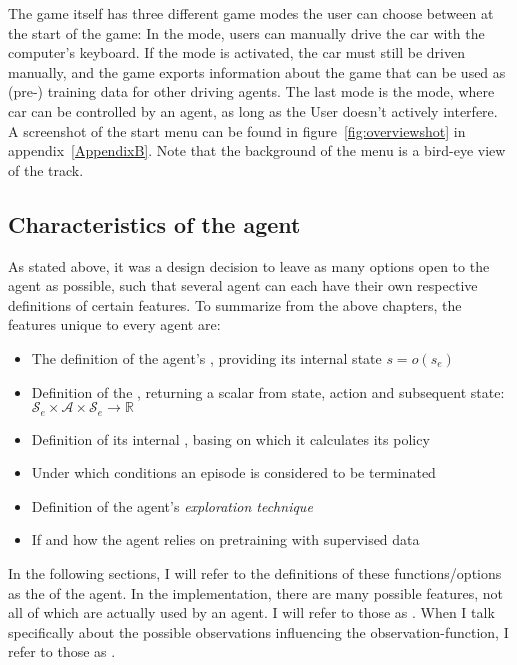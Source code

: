 The game itself has three different game modes the user can choose between at the start of the game: In the  mode, users can manually drive the car with the computer's keyboard. If the  mode is activated, the car must still be driven manually, and the game exports information about the game that can be used as (pre-) training data for other driving agents. The last mode is the  mode, where car can be controlled by an agent, as long as the User doesn't actively interfere. A screenshot of the start menu can be found in figure~\ref{fig:overviewshot} in appendix~\ref{AppendixB}. Note that the background of the menu is a bird-eye view of the track.

\subsection{Characteristics of the agent}
\label{ch:agentchars}

As stated above, it was a design decision to leave as many options open to the agent as possible, such that several agent can each have their own respective definitions of certain features. To summarize from the above chapters, the features unique to every agent are:
\begin{itemize}
	\item The definition of the agent's , providing its internal state $s = o(s_e)$
	\item Definition of the , returning a scalar from state, action and subsequent state: $\mathcal{S}_e \times \mathcal{A} \times \mathcal{S}_e \rightarrow \mathds{R}$
	\item Definition of its internal , basing on which it calculates its policy
	\item Under which conditions an episode is considered to be terminated 
	\item Definition of the agent's \textit{exploration technique}
	\item If and how the agent relies on pretraining with supervised data	
\end{itemize}
\begin{flushright}
	\scriptsize
	In the following sections, I will refer to the definitions of these functions/options as the  of the agent. In the implementation, there are many possible features, not all of which are actually used by an agent. I will refer to those as . When I talk specifically about the possible observations influencing the observation-function, I refer to those as .
\end{flushright}


